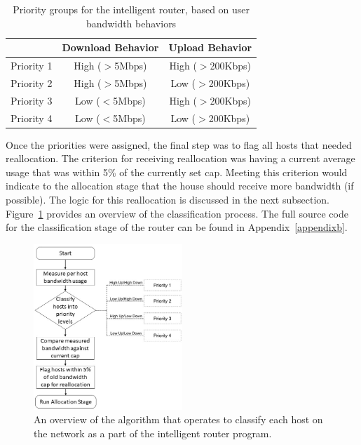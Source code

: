 \begin{table}[!ht]
\centering
\caption{Priority groups for the intelligent router, based on user bandwidth behaviors}
\begin{adjustbox}{width=0.8\textwidth, center=\textwidth}
    \begin{tabular}{r|cc}
    \multicolumn{1}{c|}{} & Download Behavior & \multicolumn{1}{l}{Upload Behavior} \\ 
    \hline
    Priority 1 & High ($>$5Mbps) & High ($>$200Kbps) \\
    Priority 2 & High ($>$5Mbps) & Low ($>$200Kbps)\\
    Priority 3 & Low ($<$5Mbps) & High ($>$200Kbps)\\
    Priority 4 & Low ($<$5Mbps) & Low ($>$200Kbps)
    \end{tabular}
\end{adjustbox}
\label{priority_table}
\end{table}
Once the priorities were assigned, the final step was to flag all hosts that needed reallocation.
The criterion for receiving reallocation was having a current average usage that was within 5\% of the currently set cap.
Meeting this criterion would indicate to the allocation stage that the house should receive more bandwidth (if possible).
The logic for this reallocation is discussed in the next subsection.
Figure~\ref{classification} provides an overview of the classification process.
The full source code for the classification stage of the router can be found in Appendix~\ref{appendixb}.
\begin{figure}[!ht]
    \centering
    \includegraphics[width=0.5\textwidth,keepaspectratio]{Images/Chpt4/Flowchart_Classification_Updated.png}
    \caption{An overview of the algorithm that operates to classify each host on the network as a part of the intelligent router program.}
    \label{classification}
\end{figure}

